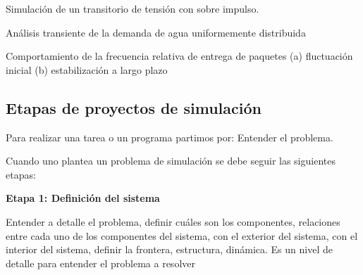 \documentclass[11pt,letterpaper]{report}
\begin{document}
\begin{center}

\vspace{0.1cm}
Simulación de un transitorio de tensión con sobre impulso.
\end{center}

\begin{center}

\vspace{0.1cm}
Análisis transiente de la demanda de agua uniformemente distribuida
\end{center}

\begin{center}

\vspace{0.1cm}
Comportamiento de la frecuencia relativa de entrega de paquetes (a) fluctuación inicial (b) estabilización a largo plazo
\end{center}

\subsection*{Etapas de proyectos de simulación}

Para realizar una tarea o un programa partimos por: Entender el problema.

Cuando uno plantea un problema de simulación se debe seguir las siguientes etapas:

\textbf{Etapa 1: Definición del sistema}

Entender a detalle el problema, definir cuáles son los componentes, relaciones entre cada uno de los componentes del sistema, con el exterior del sistema, con el interior del sistema, definir la frontera, estructura, dinámica. Es un nivel de detalle para entender el problema a resolver
\end{document}

